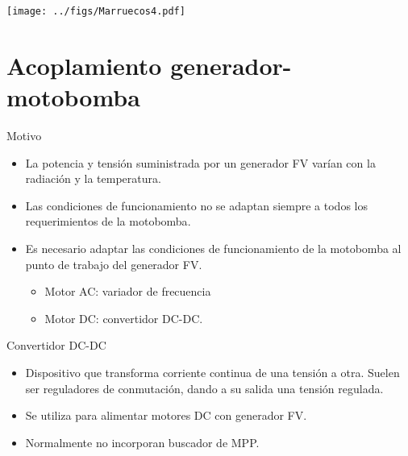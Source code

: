 \documentclass[xcolor={usenames,svgnames,dvipsnames}]{beamer}
\begin{document}
\begin{frame}[label=sec-2-3-3]{}
\texttt{[image: ../figs/Marruecos4.pdf]}
\end{frame}

\section{Acoplamiento generador-motobomba}
\label{sec-3}

\begin{frame}[label=sec-3-0-1]{Motivo}
\begin{itemize}
\item La \alert{potencia y tensión suministrada por un generador FV varían} con
la radiación y la temperatura.

\item Las condiciones de funcionamiento \alert{no se adaptan siempre a todos los
requerimientos de la motobomba}.

\item Es necesario adaptar las condiciones de funcionamiento de la
motobomba al punto de trabajo del generador FV.

\begin{itemize}
\item \alert{Motor AC: variador de frecuencia}

\item \alert{Motor DC: convertidor DC-DC.}
\end{itemize}
\end{itemize}
\end{frame}

\begin{frame}[label=sec-3-0-2]{Convertidor DC-DC}
\begin{itemize}
\item Dispositivo que \alert{transforma corriente continua de una tensión a
otra}. Suelen ser reguladores de conmutación, dando a su salida una
tensión regulada.

\item Se utiliza para alimentar \alert{motores DC con generador FV}.

\item Normalmente no incorporan buscador de MPP.
\end{itemize}
\end{frame}
\end{document}
